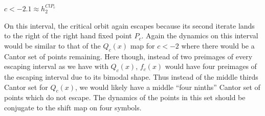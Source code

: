 	\underline{$c < -2.1 \approx h_2^{ClP_c}$}

	On this interval, the critical orbit again escapes because its second iterate lands to the right of the right hand fixed point $P_c$. Again the dynamics on this interval would be similar to that of the $Q_c (x)$ map for $c < -2$ where there would be a Cantor set of points remaining. Here though, instead of two preimages of every escaping interval as we have with $Q_c (x)$, $f_c (x)$ would have four preimages of the escaping interval due to its bimodal shape. Thus instead of the middle thirds Cantor set for $Q_c (x)$, we would likely have a middle ``four ninths'' Cantor set of points which do not escape. The dynamics of the points in this set should be conjugate to the shift map on four symbols.